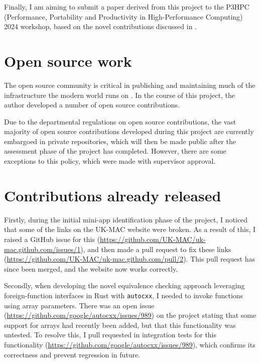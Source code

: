 
Finally, I am aiming to submit a paper derived from this project to the P3HPC (Performance, Portability and Productivity in High-Performance Computing) 2024 workshop, based on the novel contributions discussed in .


\section{Open source work}
\label{sec:open-source-work}

The open source community is critical in publishing and maintaining much of the infrastructure the modern world runs on
. In the course of this project, the author developed a number of open source contributions.

Due to the departmental regulations on open source contributions, the vast majority of open source contributions developed during this project are currently embargoed in private repositories, which will then be made public after the assessment phase of the project has completed. However, there are some exceptions to this policy, which were made with supervisor approval.

\section{Contributions already released}
\label{sec:open-source-already-released}

Firstly, during the initial mini-app identification phase of the project, I noticed that some of the links on the UK-MAC website were broken. As a result of this, I raised a GitHub issue for this (\url{https://github.com/UK-MAC/uk-mac.github.com/issues/1}), and then made a pull request to fix these links (\url{https://github.com/UK-MAC/uk-mac.github.com/pull/2}). This pull request has since been merged, and the website now works correctly.

Secondly, when developing the novel equivalence checking approach leveraging foreign-function interfaces in Rust with \texttt{autocxx}, I needed to invoke functions using array parameters. There was an open issue (\url{https://github.com/google/autocxx/issues/989}) on the project stating that some support for arrays had recently been added, but that this functionality was untested. To resolve this, I pull requested in integration tests for this functionality (\url{https://github.com/google/autocxx/issues/989}), which confirms its correctness and prevent regression in future.

